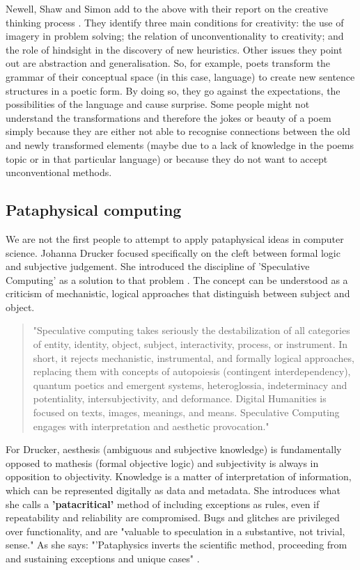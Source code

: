 Newell, Shaw and Simon add to the above with their report on the creative thinking process \citep{Newell1963}. They identify three main conditions for creativity: the use of imagery in problem solving; the relation of unconventionality to creativity; and the role of hindsight in the discovery of new heuristics. Other issues they point out are abstraction and generalisation. So, for example, poets transform the grammar of their conceptual space (in this case, language) to create new sentence structures in a poetic form. By doing so, they go against the expectations, the possibilities of the language and cause surprise. Some people might not understand the transformations and therefore the jokes or beauty of a poem simply because they are either not able to recognise connections between the old and newly transformed elements (maybe due to a lack of knowledge in the poems topic or in that particular language) or because they do not want to accept unconventional methods.

\subsection{Pataphysical computing}

We are not the first people to attempt to apply pataphysical ideas in computer science. Johanna Drucker focused specifically on the cleft between formal logic and subjective judgement. She introduced the discipline of 'Speculative Computing' as a solution to that problem \citep{Drucker2007}. The concept can be understood as a criticism of mechanistic, logical approaches that distinguish between subject and object.

\begin{quote}
  "Speculative computing takes seriously the destabilization of all categories of entity, identity, object, subject, interactivity, process, or instrument. In short, it rejects mechanistic, instrumental, and formally logical approaches, replacing them with concepts of autopoiesis (contingent interdependency), quantum poetics and emergent systems, heteroglossia, indeterminacy and potentiality, intersubjectivity, and deformance. Digital Humanities is focused on texts, images, meanings, and means. Speculative Computing engages with interpretation and aesthetic provocation." \citep[p.29]{Drucker2009}
\end{quote}

For Drucker, aesthesis (ambiguous and subjective knowledge) is fundamentally opposed to mathesis (formal objective logic) and subjectivity is always in opposition to objectivity. Knowledge is a matter of interpretation of information, which can be represented digitally as data and metadata. She introduces what she calls a \textbf{'patacritical'} method of including exceptions as rules, even if repeatability and reliability are compromised. Bugs and glitches are privileged over functionality, and are "valuable to speculation in a substantive, not trivial, sense." As she says: "'Pataphysics inverts the scientific method, proceeding from and sustaining exceptions and unique cases" \citep{Drucker2007}.

